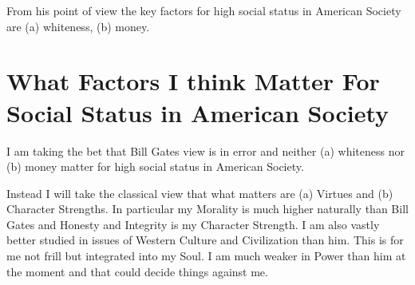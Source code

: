 \documentclass{amsart}
\begin{document}
From his point of view the key factors for high social status in American Society are (a) whiteness, (b) money.

\section{What Factors I think Matter For Social Status in American Society}

I am taking the bet that Bill Gates view is in error and neither (a) whiteness nor (b) money matter for high social status in American Society.

Instead I will take the classical view that what matters are (a) Virtues and (b) Character Strengths.  In particular my Morality is much higher naturally than Bill Gates and Honesty and Integrity is my Character Strength.  I am also vastly better studied in issues of Western Culture and Civilization than him.  This is for me not frill but integrated into my Soul.  I am much weaker in Power than him at the moment and that could decide things against me.
\end{document}
